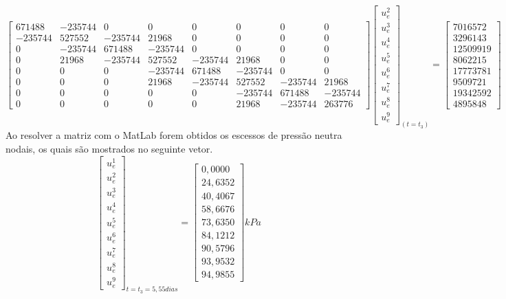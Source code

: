 \documentclass{article} %
\begin{document}
\begin{equation*}
\begin{bmatrix}
671488& -235744& 0& 0& 0& 0& 0& 0\\
-235744&527552&-235744&21968& 0& 0& 0& 0\\
0&-235744&671488&-235744& 0& 0& 0& 0\\
0&21968&-235744&527552&-235744&21968& 0& 0\\
0&0&0& -235744&671488&-235744& 0& 0\\
0&0&0&21968&-235744&527552&-235744&21968\\
0&0&0&0&0&-235744&671488&-235744\\
0&0&0&0&0&21968&-235744&263776
\end{bmatrix}\begin{bmatrix}
u_e^2\\
u_e^3\\
u_e^4\\
u_e^5\\
u_e^6\\
u_e^7\\
u_e^8\\
u_e^9
\end{bmatrix}_{(t=t_3)}
=\begin{bmatrix}
7016572\\
3296143\\
12509919\\
8062215\\
17773781\\
9509721\\
19342592\\
4895848
\end{bmatrix}
\end{equation*}
\indent Ao resolver a matriz com o MatLab forem obtidos os escessos de pressão neutra nodais, os quais são mostrados no seguinte vetor.
\begin{equation}\label{t3}
\begin{bmatrix}
u_e^1\\
u_e^2\\
u_e^3\\
u_e^4\\
u_e^5\\
u_e^6\\
u_e^7\\
u_e^8\\
u_e^9
\end{bmatrix}_{t=t_3=5,55dias}=\begin{bmatrix}
0,0000\\
24,6352\\
40,4067\\
58,6676\\
73,6350\\
84,1212\\
90,5796\\
93,9532\\
94,9855
\end{bmatrix}kPa
\end{equation}
\end{document}
